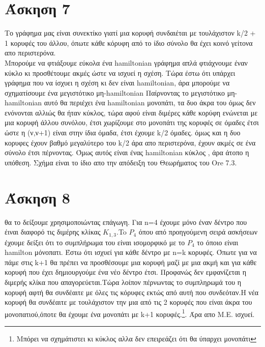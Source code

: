 \documentclass{article}
\begin{document}
\section*{Άσκηση 7}
Το γράφημα μας είναι συνεκτίκο γιατί μια κορυφή συνδαιέται με τουλάχιστον k/2 + 1 κορυφές του άλλου, όπωτε κάθε κόρυφη από το ίδιο σύνολο θα έχει κοινό γείτονα απο περιστερόνα.\\
Μπορούμε να φτιάξουμε εύκολα ένα hamiltonian γράφημα απλά φτιάχνουμε έναν κύκλο κι προσθέτουμε ακμές ώστε να ισχυεί η σχέση. Τώρα έστω ότι υπάρχει γράφημα που να ίσχυει η σχέση κι δεν είναι hamiltonian, άρα μπορούμε να σχηματίσουμε ένα μεγιστότικο μη-hamiltonian
Παίρνοντας το μεγιστότικο μη-hamiltonian αυτό θα περιέχει ένα hamiltonian μονοπάτι, τα δυο άκρα του όμως δεν ενόνονται αλλιώς θα ήταν κύκλος, τώρα αφού είναι διμέρες κάθε κορύφη ενώνεται με μια κορυφή άλλου συνόλου, έτσι χωρίζουμε στο μονοπάτι της κορυφές σε όμαδες έτσι ώστε η (ν,ν+1) είναι στην ίδια όμαδα, έτσι έχουμε k/2 όμαδες. όμως και η δυο κορυφες έχουν βαθμό μεγαλύτερο του k/2 άρα απο περιστερόνα, έχουν ακμές σε ένα σύνολο έτσι πέρνοντας. Όμως αυτός είναι ένας hamiltonian κύκλος , άρα άτοπο η υπόθεση. Σχήμα είναι το ίδιο απο την απόδειξη του Θεωρήματος του Ore 7.3.
\section*{Άσκηση 8}
θα το δείξουμε χρησιμοποιώντας επάγωγη. Για n=4 έχουμε μόνο έναν δέντρο που έιναι διαφορό τις διμέρης κλίκας $K_{1,3}$.To $P_4$ όπου από προηγούμενη σειρά ασκήσεων έχουμε δείξει ότι το συμπλήρωμα του είναι ισομορφικό με το $P_4$ το όποιο είναι hamilton μόνοπατι.
Έστω ότι ισχυεί για κάθε δέντρο με n=k κορυφές. Όπωτε για να πάμε στις k+1 θα πρέπει να  προσθέσουμε μια κορυφή μαζί με μια ακμή και για κάθε κορυφή που έχει δημιουργούμε ένα νέο δέντρο έτσι. Προφανώς δεν εμφανίζεται η διμερής κλίκα που απαγορεύεται.Τώρα λοίπον πέρνωντας το συμπληρωμά του η κορυφή αφτή θα συνδέαιτε με όλες τις κόρυφες εκτώς από αυτή που συνδεόταν.Η νέα κορυφή θα συνδέαιτε με τουλάχιστον την μια από τις 2 κορυφές που είναι άκρα του μονοπατιού,όποτε θα έχουμε ένα μονοπάτι με k+1 κορυφές.\footnote{Μπόρει να σχημάτιστει κι κύκλος αλλα δεν επειρεάζει ότι θα ύπαρχει μονοπάτι}. Άρα απο Μ.Ε. ισχυεί. 
\end{document}
